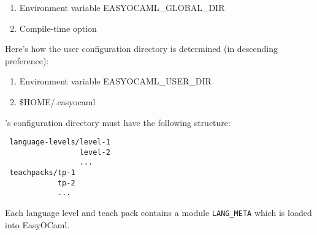 \begin{enumerate}
    \item Environment variable EASYOCAML\_GLOBAL\_DIR
    \item Compile-time option
\end{enumerate}

Here's how the user configuration directory is determined (in descending 
preference):

\begin{enumerate}
    \item Environment variable EASYOCAML\_USER\_DIR
    \item \$HOME/.easyocaml
\end{enumerate}

\easyocaml's configuration directory must have the following structure:

\begin{verbatim}
 language-levels/level-1
                 level-2
                 ...
 teachpacks/tp-1
            tp-2
            ...
\end{verbatim}

Each language level and teach pack contains a module \texttt{LANG\_META} 
which is loaded into EasyOCaml.

